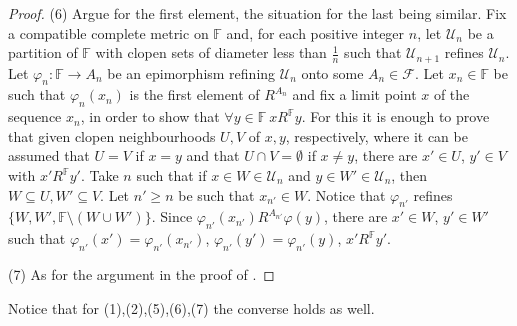 \documentclass[12pt,twoside,a4paper]{amsart}
\theoremstyle{plain}
\theoremstyle{definition}
\begin{document}
\begin{proof}
(6)
Argue for the first element, the situation for the last being similar.
Fix a compatible complete metric on $ \mathbb F $ and, for each positive integer $n$, let $ \mathcal U_n$ be a partition of $ \mathbb F $ with clopen sets of diameter less than $ \frac 1n $ such that $ \mathcal U_{n+1}$ refines $ \mathcal U_n$.
Let $\varphi_n: \mathbb F \to A_n$ be an epimorphism refining $ \mathcal U_n$ onto some $A_n\in \mathcal F $.
Let $x_n\in \mathbb F $ be such that $\varphi_n(x_n)$ is the first element of $R^{A_n}$ and fix a limit point $x$ of the sequence $x_n$, in order to show that $\forall y\in \mathbb F \ xR^{ \mathbb F }y$.
For this it is enough to prove that given clopen neighbourhoods $U,V$ of $x,y$, respectively, where it can be assumed that $U=V$ if $x=y$ and that $U\cap V=\emptyset $ if $x\neq y$, there are $x'\in U$, $y'\in V$ with $x'R^{ \mathbb F }y'$.
Take $n$ such that if $x\in W\in \mathcal U_n$ and $y\in W'\in \mathcal U_n$, then $W\subseteq U,W'\subseteq V$.
Let $n'\geq n$ be such that $x_{n'}\in W$.
Notice that $\varphi_{n'}$ refines $\{ W,W', \mathbb F \setminus (W\cup W')\} $.
Since $\varphi_{n'}(x_{n'})R^{A_{n'}}\varphi (y)$, there are $x'\in W$, $y'\in W'$ such that $\varphi_{n'}(x')=\varphi_{n'}(x_{n'})$, $\varphi_{n'}(y')=\varphi_{n'}(y)$, $x'R^{ \mathbb F }y'$.

(7)
As for the argument in the proof of \cite[lemma 4.3]{Irwin2006}.
\end{proof}

Notice that for (1),(2),(5),(6),(7) the converse holds as well.
\end{document}

